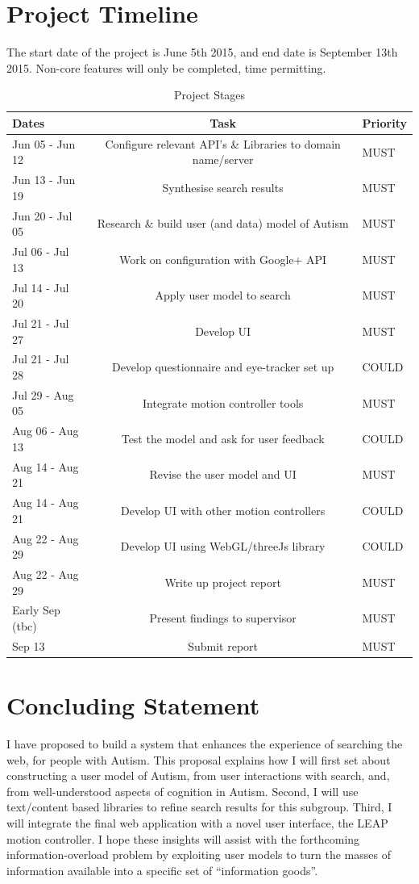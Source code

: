 \documentclass[a4paper, 11pt]{article}
\begin{document}
\begin{justify}
\section{Project Timeline}\label{plan}
The start date of the project is June 5th 2015, and end date is September 13th 2015. Non-core features will only be completed, time permitting.
\begin{table}[H]
\caption{Project Stages} 
\centering
\begin{tabular}{ | L |c| L |}
\hline\hline 
Dates & Task & Priority\\ [0.5ex]
\hline 
Jun 05 - Jun 12 & Configure relevant API's \& Libraries to domain name/server & MUST\\
\hline 
Jun 13 - Jun 19 & Synthesise search results & MUST\\
\hline 
Jun 20 - Jul 05 & Research \& build user (and data) model of Autism & MUST\\
\hline 
Jul 06 - Jul 13 & Work on configuration with Google+ API & MUST\\
\hline 
Jul 14 - Jul 20 & Apply user model to search& MUST\\ 
\hline 
Jul 21 - Jul 27 & Develop UI & MUST\\
\hline 
Jul 21 - Jul 28 & Develop questionnaire and eye-tracker set up & COULD\\
\hline 
Jul 29 - Aug 05 & Integrate motion controller tools& MUST\\
\hline 
Aug 06 - Aug 13 & Test the model and ask for user feedback & COULD\\
\hline 
Aug 14 - Aug 21 & Revise the user model and UI & MUST\\
\hline 
Aug 14 - Aug 21 & Develop UI with other motion controllers & COULD\\
\hline 
Aug 22 - Aug 29 & Develop UI using WebGL/threeJs library & COULD\\
\hline 
Aug 22 - Aug 29 & Write up project report & MUST\\ 
\hline 
Early Sep (tbc) & Present findings to supervisor & MUST\\
\hline 
Sep 13 & Submit report & MUST\\[0.5ex]
\hline
\end{tabular}
\label{stages} 
\end{table}

\section{Concluding Statement}\label{future}
I have proposed to build a system that enhances the experience of searching the web, for people with Autism. This proposal explains how I will first set about constructing a user model of Autism, from user interactions with search, and, from well-understood aspects of cognition in Autism. Second, I will use text/content based libraries to refine search results for this subgroup. Third, I will integrate the final web application with a novel user interface, the LEAP motion controller. I hope these insights will assist with the forthcoming information-overload problem by exploiting user models to turn the masses of information available into a specific set of “information goods”.


\end{justify}
\end{document}
